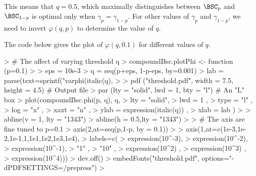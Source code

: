 This means that $q=0.5$, which maximally distinguishes
between $\BSC_p$ and $\BSC_{1-p}$ is optimal only when $γ_p =
γ_{1-p}$. For other values of $γ_p$ and $γ_{1-p}$, we need to
invert $φ(q,p)$ to determine the value of $q$. 

\begin{Schunk}
\end{Schunk}

The code below gives the plot of $φ(q,0.1)$ for different values of $q$.

\begin{Schunk}
\begin{Sinput}
> # The affect of varying threshold q
> compoundBsc.plotPhi <- function (p=0.1)
> {
>   eps = 10e-3
>   q   = seq(p+eps, 1-p-eps, by=0.001)            
>   lab = parse(text=sprintf("varphi(italic(q), %.1f)", p))
> 
>   pdf ("threshold.pdf", width = 7.5, height = 4.5)  # Output file
>   par (lty = "solid", lwd = 1, bty = "l")           # An "L" box
>   plot(compoundBsc.phi(p, q), q,
>        lty  = "solid",
>        lwd  = 1      ,
>        type = "l"    ,
>        log  = "x"    ,
>        xaxt = "n"    ,
>        ylab = expression(italic(q)) ,
>        xlab = lab    )
> 
>   abline(v = 1,  lty = "1343")
>   abline(h = 0.5,lty = "1343")
> 
>   # The axis are fine tuned to p=0.1
>   axis(2,at=seq(p,1-p, by = 0.1))
> 
>   axis(1,at=c(1e-3,1e-2,1e-1,1,1e1,1e2,1e3,1e4), 
>   labels=c(
>              expression(10^-3), 
>              expression(10^-2), 
>              expression(10^-1), 
>              "1"              , 
>              "10"             , 
>              expression(10^2) , 
>              expression(10^3) ,
>              expression(10^4)))
>   dev.off()
>   embedFonts("threshold.pdf", options="-dPDFSETTINGS=/prepress")
> }
\end{Sinput}
\end{Schunk}


